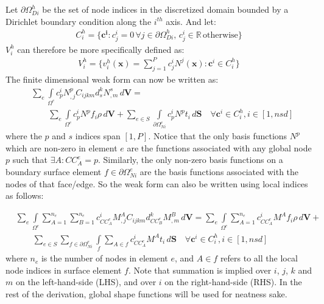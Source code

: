 	
	Let $\partial \Omega^h_{Di}$ be the set of node indices in the discretized domain bounded by a Dirichlet boundary condition along the $i^{th}$ axis. And let:
	\begin{align}
	    C^h_i = \{\bm{c^i} : c^i_j = 0 \, \forall j \in \partial \Omega^h_{Di}, \, c^i_j\in\mathbb{R}\, \text{otherwise}\}
	\end{align}
    $V_i^h$ can therefore be more specifically defined as:
    \begin{align}
        V_i^h = \{v^h_i(\bm{x}) = \sum_{j=1}^Pc^i_jN^j(\bm{x}): \bm{c}^i \in C^h_i\}
    \end{align}
	The finite dimensional weak form can now be written as:
	\begin{align}
		& \sum_e \int\limits_{\Omega^e} c^i_pN^p_{,j}C_{ijkm}d^k_sN^s_{,m} \,d\bm{V} = \nonumber \\
		& \qquad \sum_e \int\limits_{\Omega^e} c^i_pN^p f_i \rho\,d\bm{V} + \sum_{e \in S} \int\limits_{\partial \Omega^e_{Ni}} c^i_pN^p t_i \,d\bm{S} \quad \forall \bm{c}^i \in C^h_i, i \in [1,nsd]
	\end{align}
	where the $p$ and $s$ indices span $[1,P]$. Notice that the only basis functions $N^p$ which are non-zero in element $e$ are the functions associated with any global node $p$ such that $\exists A : CC^e_A = p$. Similarly, the only non-zero basis functions on a boundary surface element $f \in \partial \Omega^e_{Ni}$ are the basis functions associated with the nodes of that face/edge. So the weak form can also be written using local indices as follows:

	\begin{align}
		& \sum_e \int\limits_{\Omega^e} \sum_{A=1}^{n_e} \sum_{B=1}^{n_e} c^i_{CC^e_A}M^A_{,j}C_{ijkm}d^k_{CC^e_B}M^B_{,m} \,d\bm{V} = \sum_e \int\limits_{\Omega^e} \sum_{A=1}^{n_e} c^i_{CC^e_A}M^A f_i \rho\,d\bm{V} +  \nonumber \\
		& \qquad \sum_{e \in S} \sum_{f \in \partial \Omega^e_{Ni}} \int\limits_{f} \sum_{A \in f} c^i_{CC^e_A}M^A t_i \,d\bm{S} \quad \forall \bm{c}^i \in C^h_i, i \in [1,nsd]
	\end{align}
	where $n_e$ is the number of nodes in element $e$, and $A \in f$ refers to all the local node indices in surface element $f$. Note that summation is implied over $i$, $j$, $k$ and $m$ on the left-hand-side (LHS), and over $i$ on the right-hand-side (RHS). In the rest of the derivation, global shape functions will be used for neatness sake.

